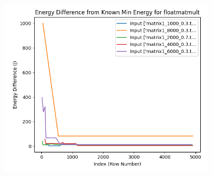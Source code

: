 \documentclass[times, 10pt,twocolumn]{article}
\begin{document}
\begin{figure}[ht]
\begin{subfigure}[b]{0.3\textwidth}
     \caption{}
     \label{fig:matmult_energy_diff}
   \end{subfigure}
   \hfill
   \begin{subfigure}[b]{0.3\textwidth}
      \includegraphics[width=\textwidth]{imgs/final_experiment_plots/model_analysis/measurement_data_analysis/matmult_compare_min.png}
     \caption{}
     \label{fig:matmult_comparemin}
   \end{subfigure}
   

\end{figure}
\end{document}

